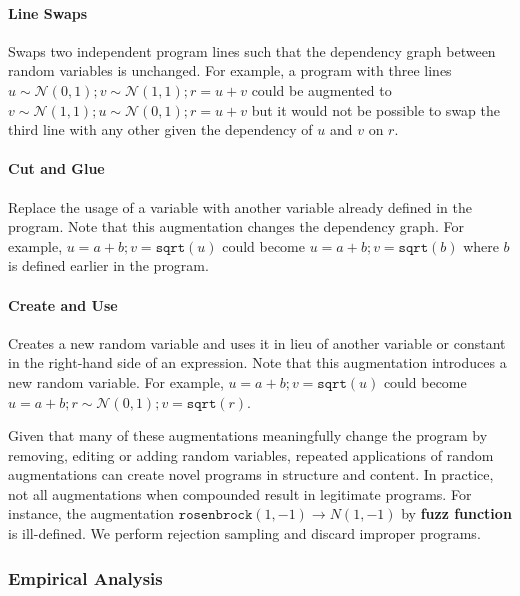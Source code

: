 \paragraph{Line Swaps} Swaps two independent program lines such that the dependency graph between random variables is unchanged. For example, a program with three lines $u \sim \mathcal{N}(0, 1); v \sim \mathcal{N}(1, 1); r = u + v$ could be augmented to $v \sim \mathcal{N}(1, 1); u \sim \mathcal{N}(0, 1); r = u + v$ but it would not be possible to swap the third line with any other given the dependency of $u$ and $v$ on $r$.

\paragraph{Cut and Glue} Replace the usage of a variable with another variable already defined in the program. Note that this augmentation changes the dependency graph. For example, $u = a + b; v = \texttt{sqrt}(u)$ could become $u = a + b; v = \texttt{sqrt}(b)$ where $b$ is defined earlier in the program.

\paragraph{Create and Use} Creates a new random variable and uses it in lieu of another variable or constant in the right-hand side of an expression. Note that this augmentation introduces a new random variable. For example, $u = a + b; v = \texttt{sqrt}(u)$ could become $u = a + b; r \sim \mathcal{N}(0, 1); v = \texttt{sqrt}(r)$.

Given that many of these augmentations meaningfully change the program by removing, editing or adding random variables, repeated applications of random augmentations can create novel programs in structure and content. In practice, not all augmentations when compounded result in legitimate programs. For instance, the augmentation $\texttt{rosenbrock}(1, -1) \rightarrow N(1, -1)$ by \textbf{fuzz function} is ill-defined. We perform rejection sampling and discard improper programs.

\subsubsection{Empirical Analysis}
\label{sec:toyexpt2}

